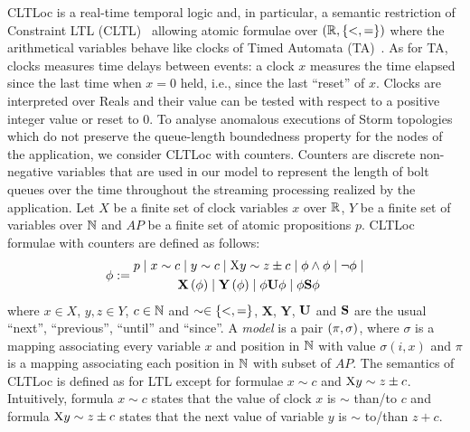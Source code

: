 \documentclass[smallextended]{svjour3}       %
\begin{document}
CLTLoc is a real-time temporal logic and, in particular, a semantic restriction of Constraint LTL (CLTL)~\cite{DD07} allowing atomic formulae over $(\mathbb{R}, \{ <,= \})$ where the arithmetical variables behave like clocks of Timed Automata (TA)~\cite{timed}.
As for TA, clocks measures time delays between events: a clock $x$ measures the time elapsed since the last time when $x=0$ held, i.e., since the last ``reset'' of $x$.
Clocks are interpreted over Reals and their value can be tested with respect to a positive integer value or reset to 0.
%
To analyse anomalous executions of Storm topologies which do not preserve the queue-length boundedness property for the nodes of the application, we consider CLTLoc with counters.
Counters are discrete non-negative variables that are used in our model to represent the length of bolt queues over the time throughout the streaming processing realized by the application.
Let $X$ be a finite set of clock variables $x$ over $\mathbb{R}$, $Y$ be a finite set of variables over $\mathbb{N}$ and $AP$ be a finite set of atomic propositions $p$.
CLTLoc formulae with counters are defined as follows:
\begin{equation*}%
  \phi :=
  \begin{gathered}
    p \mid x\sim c \mid y\sim c\mid \aX y\sim z\pm c \mid\phi \wedge \phi \mid \neg \phi \mid \\
       \X{\phi} \mid \Y{\phi} %
\mid \phi\U\phi \mid \phi\Snc\phi
  \end{gathered}
\end{equation*}
where $x \in X$, $y,z \in Y$, $c \in \mathbb{N}$ and 
$\sim \in \{ <,= \}$, $\mathbf{X}$, $\mathbf{Y}$, $\mathbf{U}$ and $\mathbf{S}$ are the
usual ``next'', ``previous'', ``until'' and ``since''.
A \textit{model} is a pair $(\pi, \sigma)$, where $\sigma$ is a mapping associating every variable $x$ and position in $\mathbb{N}$ with value $\sigma(i,x)$ and $\pi$ is a mapping associating each position in $\mathbb{N}$ with subset of $AP$. 
The semantics of CLTLoc is defined as for LTL except for formulae $x\sim c$ and $\mathrm{X} y \sim z\pm c$. 
Intuitively, formula $x\sim c$ states that the value of clock $x$ is $\sim$ than/to $c$ and formula $\mathrm{X} y \sim z\pm c$ states that the next value of variable $y$ is $\sim$ to/than $z+c$.
\end{document}
